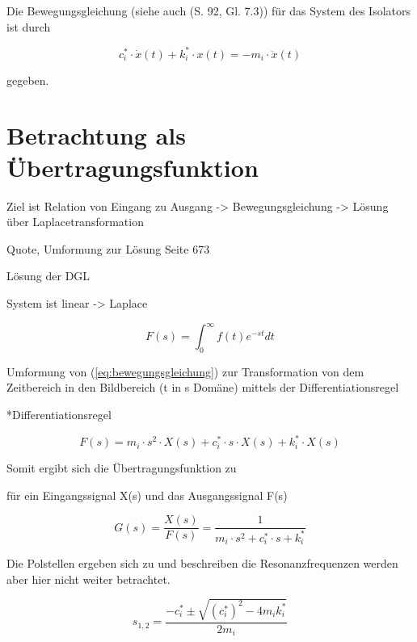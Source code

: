 Die Bewegungsgleichung (siehe auch \cite{Kramer} (S. 92, Gl. 7.3)) für das System des Isolators ist durch

\begin{equation}\label{eq:bewegungsgleichung}
c_i^* \cdot \dot x(t) + k_i^* \cdot x(t) = - m_i \cdot \ddot x(t)
\end{equation}

gegeben.

\pagebreak

\section{Betrachtung als Übertragungsfunktion}
\label{sec:ubertragungsfunktion}

Ziel ist Relation von Eingang zu Ausgang -> Bewegungsgleichung -> Lösung über Laplacetransformation

Quote, Umformung zur Lösung Seite 673

Lösung der DGL

System ist linear -> Laplace 


\begin{equation} \label{laplace}
F(s) = \int_{0}^{\infty} f(t)e^{-st}dt
\end{equation}

Umformung von (\cref{eq:bewegungsgleichung}) zur Transformation von dem Zeitbereich in den Bildbereich (t in s Domäne) mittels der Differentiationsregel

*Differentiationsregel

\begin{equation} \label{laplace1}
F(s) = m_i \cdot s^2 \cdot X(s) + c_i^* \cdot s \cdot X(s) + k_i^* \cdot X(s)
\end{equation}

Somit ergibt sich die Übertragungsfunktion zu

für ein Eingangssignal X(s) und das Ausgangssignal F(s)

\begin{equation} \label{laplace2}
G(s)=\frac{X(s)}{F(s)} = \frac{1}{m_i \cdot s^2 + c_i^* \cdot s + k_i^*}
\end{equation}

Die Polstellen ergeben sich zu und beschreiben die Resonanzfrequenzen werden aber hier nicht weiter betrachtet.

\begin{equation} \label{laplace-pole}
s_{1,2} = \frac{-c_i^* \pm \sqrt{(c_i^*)^2 - 4m_ik_i^*}}{2m_i}
\end{equation}

